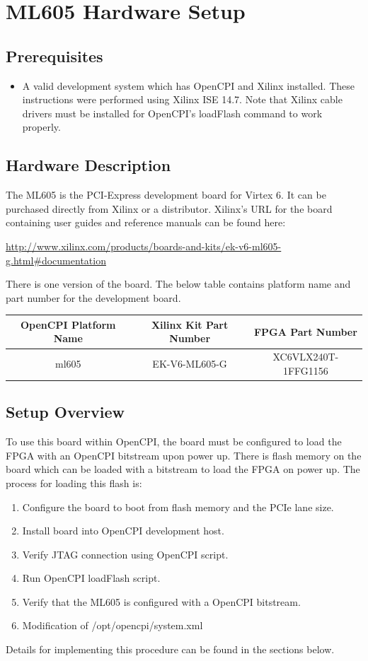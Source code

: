 \documentclass{article}
\begin{document}
\section*{ML605 Hardware Setup}
\subsection*{Prerequisites}
\begin{itemize}
\item A valid development system which has OpenCPI and Xilinx installed. These instructions were performed using Xilinx ISE 14.7. Note that Xilinx cable drivers must be installed for OpenCPI's loadFlash command to work properly.
\end{itemize}
\subsection*{Hardware Description}
The ML605 is the PCI-Express development board for Virtex 6. It can be purchased directly from Xilinx or a distributor. Xilinx's URL for the board containing user guides and reference manuals can be found here:\par\bigskip
​\url{http://www.xilinx.com/products/boards-and-kits/ek-v6-ml605-g.html#documentation}\par\bigskip
\noindent  There is one version of the board. The below table contains platform name and part number for the development board.\par\bigskip
\begin{tabular}{|c|c|c|}
\hline
\rowcolor{blue}
OpenCPI Platform Name & Xilinx Kit Part Number & FPGA Part Number \\
\hline
ml605 & EK-V6-ML605-G & XC6VLX240T-1FFG1156 \\
\hline
\end{tabular}\par\bigskip
\subsection*{Setup Overview}
To use this board within OpenCPI, the board must be configured to load the FPGA with an OpenCPI bitstream upon power up. There is flash memory on the board which can be loaded with a bitstream to load the FPGA on power up. The process for loading this flash is:
\begin{enumerate}
\item Configure the board to boot from flash memory and the PCIe lane size.
\item Install board into OpenCPI development host.
\item Verify JTAG connection using OpenCPI script.
\item Run OpenCPI loadFlash script.
\item Verify that the ML605 is configured with a OpenCPI bitstream.
\item Modification of /opt/opencpi/system.xml
\end{enumerate}
 Details for implementing this procedure can be found in the sections below.
\pagebreak
\end{document}
